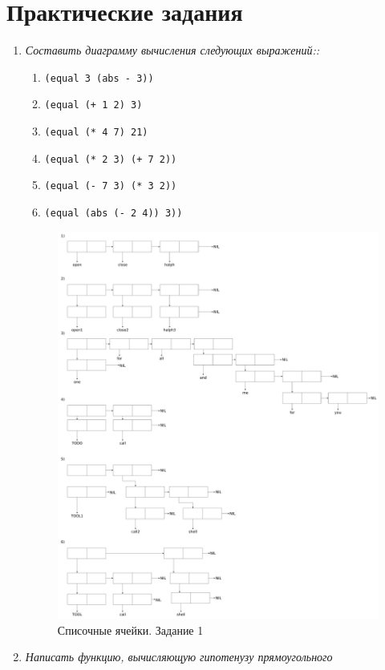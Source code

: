 \chapter{Практические задания}

\begin{enumerate}[wide=0pt]
\item \textit{Составить диаграмму вычисления следующих выражений::}
\begin{enumerate}[label=\arabic*)]
	\item \lstinline {(equal 3 (abs - 3))}
	\item \lstinline {(equal (+ 1 2) 3)}
	\item \lstinline {(equal (* 4 7) 21)}
	\item \lstinline {(equal (* 2 3) (+ 7 2))}
	\item \lstinline {(equal (- 7 3) (* 3 2))}
	\item \lstinline {(equal (abs (- 2 4)) 3))}
	
\end{enumerate}


\begin{figure}[ht!]
	\centering
	\includegraphics[width=1\linewidth]{assets/task1/1.pdf}
	\caption{Списочные ячейки. Задание 1}
\end{figure}
\FloatBarrier



\item  \textit{Написать функцию, вычисляющую гипотенузу прямоугольного}

\end{enumerate}